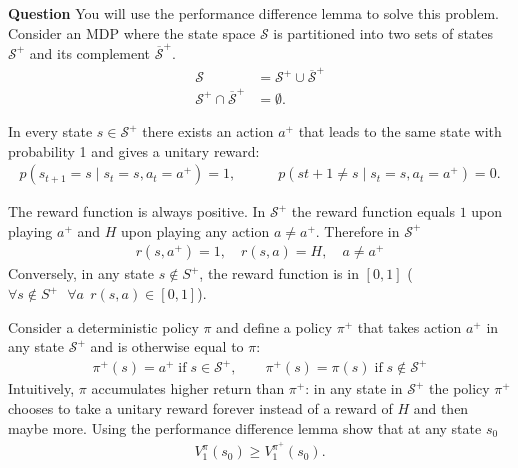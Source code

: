 \documentclass[11pt]{article}
\begin{document}
\textbf{Question}
You will use the performance difference lemma to solve this problem. Consider an MDP where the state space $\mathcal S$ is partitioned into two sets of states $\mathcal S^+$ and its complement $\overline{\mathcal S}^+$.
\begin{align}
\mathcal S & = \mathcal S^+ \cup \overline{\mathcal S}^+ \\
\mathcal S^+ \cap \overline{\mathcal S}^+ & = \emptyset.
\end{align}

In every state $s \in \mathcal S^+$ there exists an action $a^+$ that leads to the same state with probability 1 and gives a unitary reward:
\begin{align}
    p(s_{t+1} = s \mid s_{t} =s,a_t=a^+) = 1, \quad \quad \quad p(s{t+1} \neq s \mid s_{t} =s,a_t=a^+) = 0.
\end{align}

The reward function is always positive. In $\mathcal S^+$ the reward function equals $1$ upon playing $a^+$ and $H$ upon playing any action $a \neq a^+$.  Therefore in $ \mathcal S^+$
\begin{align}
    r(s,a^+) = 1, \quad   r(s,a) = H, \quad  a \neq a^+
\end{align}
Conversely, in any state $s \not \in S^+$, the reward function is in $[0,1]$ ($\forall s \not \in S^+ \ \ \ \forall a \ \ r(s,a) \in [0,1]$).

Consider a deterministic policy $\pi$ and define a policy $\pi^+$ that takes action $a^+$ in any state $\mathcal S^+$ and is otherwise equal to $\pi$:
\begin{align}
    \pi^+(s) = a^+ \; \text{if} \; s \in \mathcal S^+, \quad \quad \pi^+(s) = \pi(s) \; \text{if} \; s \not\in \mathcal S^+
\end{align}
Intuitively, $\pi$ accumulates higher return than $\pi^+$: in any state in $\mathcal S^+$ the policy $\pi^+$ chooses to take a unitary reward forever instead of a reward of $H$ and then maybe more.
Using the performance difference lemma show that at any state $s_0$
\begin{align}
    V^{\pi}_{1}(s_0) \geq  V^{\pi^+}_{1}(s_0).
\end{align}


\begin{tcolorbox}[breakable]



\end{tcolorbox}

\newpage
\end{document}
